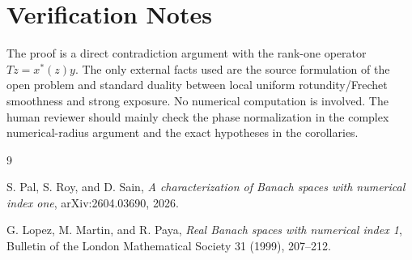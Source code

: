 \documentclass[11pt]{article}
\begin{document}
\section*{Verification Notes}

The proof is a direct contradiction argument with the rank-one operator $Tz=x^*(z)y$.  The only external facts used are the source formulation of the open problem and standard duality between local uniform rotundity/Frechet smoothness and strong exposure.  No numerical computation is involved.  The human reviewer should mainly check the phase normalization in the complex numerical-radius argument and the exact hypotheses in the corollaries.

\begin{thebibliography}{9}

S. Pal, S. Roy, and D. Sain,
\emph{A characterization of Banach spaces with numerical index one},
arXiv:2604.03690, 2026.

G. Lopez, M. Martin, and R. Paya,
\emph{Real Banach spaces with numerical index 1},
Bulletin of the London Mathematical Society 31 (1999), 207--212.

\end{thebibliography}
\end{document}
